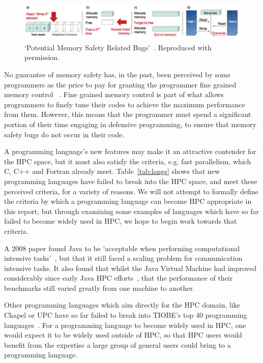 \documentclass{report}[a4]
\begin{document}
\begin{figure}[h]
  \centering
  \includegraphics[width=\linewidth]{figures/memory-safety.png}
  \caption{`Potential Memory Safety Related Bugs'~\cite{blanco-cuaresma_bolmont_2016}. Reproduced with permission.}
  \label{fig:mem}
\end{figure}

No guarantee of memory safety has, in the past, been perceived by some programmers as the price to pay for granting the programmer fine grained memory control ~\cite{UCAM-CL-TR-798}. Fine grained memory control is part of what allows programmers to finely tune their codes to achieve the maximum performance from them. However, this means that the programmer must spend a significant portion of their time engaging in defensive programming, to ensure that memory safety bugs do not occur in their code.

A programming language's new features may make it an attractive contender for the HPC space, but it must also satisfy the criteria, e.g. fast parallelism, which C, C++ and Fortran already meet. Table~\ref{tab:langs} shows that new programming languages have failed to break into the HPC space, and meet these perceived criteria, for a variety of reasons. We will not attempt to formally define the criteria by which a programming language can become HPC appropriate in this report, but through examining some examples of languages which have so far failed to become widely used in HPC, we hope to begin work towards that criteria.

A 2008 paper found Java to be `acceptable when performing computational intensive tasks'~\cite{amedro}, but that it still faced a scaling problem for communication intensive tasks. It also found that whilst the Java Virtual Machine had improved considerably since early Java HPC efforts~\cite{philippsen2000javagrande}, that the performance of their benchmarks still varied greatly from one machine to another.

Other programming languages which aim directly for the HPC domain, like Chapel or UPC have so far failed to break into TIOBE's top 40 programming languages~\cite{TiobeMarch2019}. For a programming language to become widely used in HPC, one would expect it to be widely used outside of HPC, so that HPC users would benefit from the expertise a large group of general users could bring to a programming language.
\end{document}
